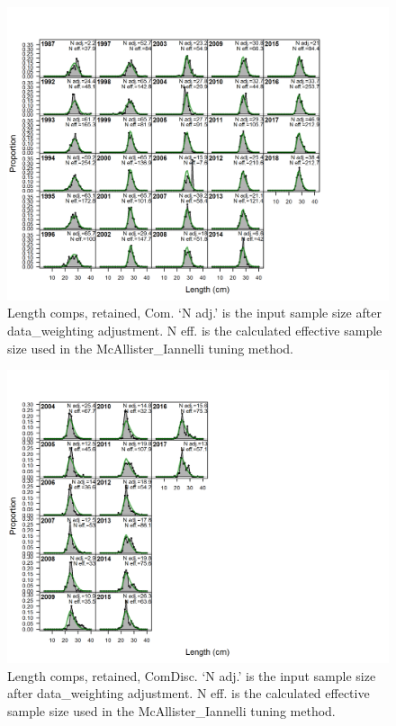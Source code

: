 \documentclass[12pt,]{article}
\begin{document}
\begin{figure}
\centering
\includegraphics{./r4ss/plots_mod1/comp_lenfit_flt1mkt2.png}
\caption{Length comps, retained, Com. `N adj.' is the input sample size
after data\_weighting adjustment. N eff. is the calculated effective
sample size used in the McAllister\_Iannelli tuning method.
\label{fig:mod1_1_comp_lenfit_flt1mkt2}}
\end{figure}

\begin{figure}
\centering
\includegraphics{./r4ss/plots_mod1/comp_lenfit_flt2mkt2.png}
\caption{Length comps, retained, ComDisc. `N adj.' is the input sample
size after data\_weighting adjustment. N eff. is the calculated
effective sample size used in the McAllister\_Iannelli tuning method.
\label{fig:mod1_2_comp_lenfit_flt2mkt2}}
\end{figure}
\end{document}
